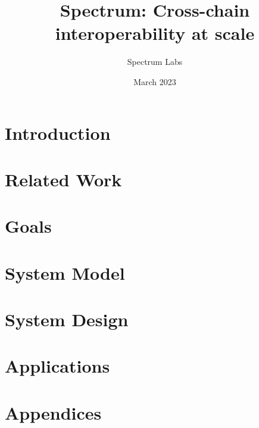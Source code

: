 \documentclass{article}
\title{Spectrum: Cross-chain interoperability at scale}
\author{Spectrum Labs}
\date{March 2023}
\begin{document}
    \begin{sloppypar}
        \maketitle


        \section{Introduction}\label{sec:introduction}
        


        \section{Related Work}\label{sec:related-work}
        


        \section{Goals}\label{sec:goals}
        


        \section{System Model}\label{sec:system-model}
        


        \section{System Design}\label{sec:system-design}
        


        \section{Applications}\label{sec:applications}
        

        \newpage
        \printbibliography

        \newpage
        \appendix
        \section*{Appendices}\label{sec:appendix}
        \renewcommand{\thesubsection}{\Alph{subsection}}
        

    \end{sloppypar}
\end{document}
